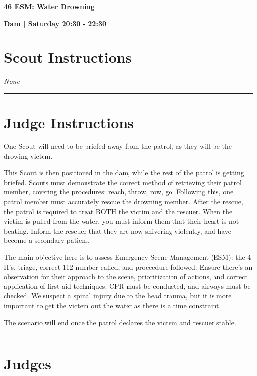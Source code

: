 \documentclass[10pt]{article}
\newcommand{\newtitle}[1]{\begin{center}{\Huge\bfseries #1 }\\ \vspace{5mm}\end{center}}
\newcommand{\newsubtitle}[1]{\begin{center}{\color{grey}\Large\bfseries #1 }\\ \vspace{5mm}\end{center}}
\begin{document}
	\vspace{1cm}


	\clearpage
		\newtitle{46 ESM: Water Drowning }
	\newsubtitle{Dam | Saturday 20:30 - 22:30}
		\setcounter{section}{45}
	\section*{Scout Instructions}
		\textit{None}
	
	\vspace{0.5cm}
	\hrule
	\vspace{0.5cm}

		\section*{Judge Instructions}
		One Scout will need to be briefed away from the patrol, as they will be the drowing victem.



This Scout is then positioned in the dam, while the rest of the patrol is getting briefed. Scouts must demonstrate the correct method of retrieving their patrol member, covering the procedures: reach, throw, row, go. Following this, one patrol member must accurately rescue the drowning member. After the rescue, the patrol is required to treat BOTH the victim and the rescuer. When the victim is pulled from the water, you must inform them that their heart is not beating. Inform the rescuer that they are now shivering violently, and have become a secondary patient.



The main objective here is to assess Emergency Scene Management (ESM): the 4 H's, triage, correct 112 number called, and proceedure followed. Ensure there's an observation for their approach to the scene, prioritization of actions, and correct application of first aid techniques. CPR must be conducted, and airways must be checked. We suspect a spinal injury due to the head trauma, but it is more important to get the victem out the water as there is a time constraint.



The scenario will end once the patrol declares the victem and rescuer stable.


\vspace{0.5cm}
	\hrule
	\vspace{0.5cm}
		\section*{\faUsers \: Judges}
\end{document}
